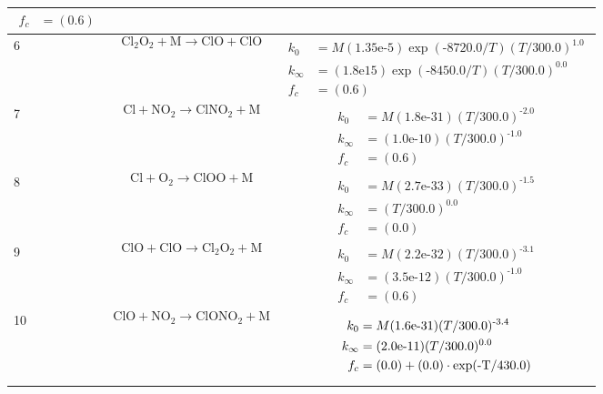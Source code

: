 \begin{longtable}{| m{} | m{}| m{} |}
$$\begin{aligned}
    f_c &= (\textrm{0.6}) 
\end{aligned}
$$
 \\
\hline
 6 & $$ \mathrm{Cl_2O_2} + \mathrm{M}\longrightarrow \mathrm{ClO} + \mathrm{ClO} $$ & $$
\begin{aligned}
    k_0 &= M(\textrm{1.35e-5})\exp(\textrm{-8720.0}/T)(T/\textrm{300.0})^{\textrm{1.0}} \\
    k_{\infty} &= (\textrm{1.8e15})\exp(\textrm{-8450.0}/T)(T/\textrm{300.0})^{\textrm{0.0}} \\
    f_c &= (\textrm{0.6}) 
\end{aligned}
$$
 \\
\hline
 7 & $$ \mathrm{Cl} + \mathrm{NO_2}\longrightarrow \mathrm{ClNO_2} + \mathrm{M} $$ & $$
\begin{aligned}
    k_0 &= M(\textrm{1.8e-31})(T/\textrm{300.0})^{\textrm{-2.0}} \\
    k_{\infty} &= (\textrm{1.0e-10})(T/\textrm{300.0})^{\textrm{-1.0}} \\
    f_c &= (\textrm{0.6}) 
\end{aligned}
$$
 \\
\hline
 8 & $$ \mathrm{Cl} + \mathrm{O_2}\longrightarrow \mathrm{ClOO} + \mathrm{M} $$ & $$
\begin{aligned}
    k_0 &= M(\textrm{2.7e-33})(T/\textrm{300.0})^{\textrm{-1.5}} \\
    k_{\infty} &= (T/\textrm{300.0})^{\textrm{0.0}} \\
    f_c &= (\textrm{0.0}) 
\end{aligned}
$$
 \\
\hline
 9 & $$ \mathrm{ClO} + \mathrm{ClO}\longrightarrow \mathrm{Cl_2O_2} + \mathrm{M} $$ & $$
\begin{aligned}
    k_0 &= M(\textrm{2.2e-32})(T/\textrm{300.0})^{\textrm{-3.1}} \\
    k_{\infty} &= (\textrm{3.5e-12})(T/\textrm{300.0})^{\textrm{-1.0}} \\
    f_c &= (\textrm{0.6}) 
\end{aligned}
$$
 \\
\hline
 10 & $$ \mathrm{ClO} + \mathrm{NO_2}\longrightarrow \mathrm{ClONO_2} + \mathrm{M} $$ & $$
\begin{aligned}
    k_0 &= M(\textrm{1.6e-31})(T/\textrm{300.0})^{\textrm{-3.4}} \\
    k_{\infty} &= (\textrm{2.0e-11})(T/\textrm{300.0})^{\textrm{0.0}} \\
    f_c &= (\textrm{0.0}) + (\textrm{0.0})\cdot\exp(\textrm{-T/\textrm{430.0}}) 

\end{aligned}$$
\end{longtable}
